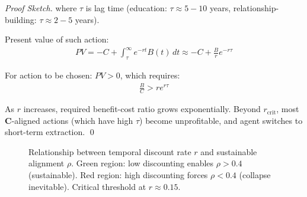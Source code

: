 \documentclass[11pt,a4paper]{article}
\theoremstyle{definition}
\theoremstyle{remark}
\begin{document}
\begin{enumerate}
\begin{proof}[Proof Sketch]
where \(\tau\) is lag time (education: \(\tau \approx 5-10\) years, relationship-building: \(\tau \approx 2-5\) years).

Present value of such action:
\begin{align}
PV = -C + \int_\tau^\infty e^{-rt} B(t) \, dt \approx -C + \frac{B}{r} e^{-r\tau}
\end{align}

For action to be chosen: \(PV > 0\), which requires:
\begin{align}
\frac{B}{C} > r e^{r\tau}
\end{align}

As \(r\) increases, required benefit-cost ratio grows exponentially. Beyond \(r_{\text{crit}}\), most \(\mathbf{C}\)-aligned actions (which have high \(\tau\)) become unprofitable, and agent switches to short-term extraction. \qed
\end{proof}

\begin{figure}[H]
\centering
{}
\caption{Relationship between temporal discount rate \(r\) and sustainable alignment \(\rho\). Green region: low discounting enables \(\rho > 0.4\) (sustainable). Red region: high discounting forces \(\rho < 0.4\) (collapse inevitable). Critical threshold at \(r \approx 0.15\).}
\label{fig:discount_alignment}
\end{figure}


\end{enumerate}
\end{document}
